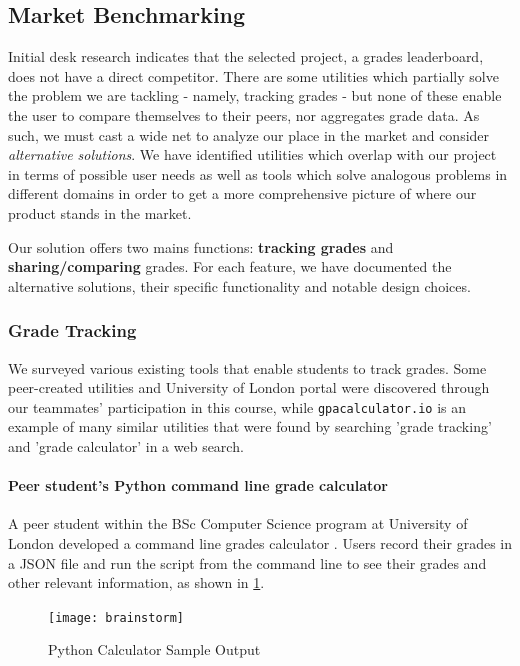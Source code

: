 \subsection{Market Benchmarking}
Initial desk research indicates that the selected project, a grades leaderboard, does not have a direct competitor. There are some utilities which partially solve the problem we are tackling - namely, tracking grades - but none of these enable the user to compare themselves to their peers, nor aggregates grade data. As such, we must cast a wide net to analyze our place in the market and consider \emph{alternative solutions}. We have identified utilities which overlap with our project in terms of possible user needs as well as tools which solve analogous problems in different domains in order to get a more comprehensive picture of where our product stands in the market.

Our solution offers two mains functions: \textbf{tracking grades} and \textbf{sharing/comparing} grades. For each feature, we have documented the alternative solutions, their specific functionality and notable design choices.

\subsubsection{Grade Tracking}
We surveyed various existing tools that enable students to track grades. Some peer-created utilities and University of London portal were discovered through our teammates' participation in this course, while \texttt{gpacalculator.io} \cite{gpa_calculator} is an example of many similar utilities that were found by searching 'grade tracking' and 'grade calculator' in a web search.

\paragraph{Peer student's Python command line grade calculator}
A peer student within the BSc Computer Science program at University of London developed a command line grades calculator \cite{lavoie_2020}. Users record their grades in a JSON file and run the script from the command line to see their grades and other relevant information, as shown in \cref{fig:py-calc}.

\begin{figure}[H]
\centering
\texttt{[image: brainstorm]}
\caption{Python Calculator Sample Output}
\label{fig:py-calc}
\end{figure}

